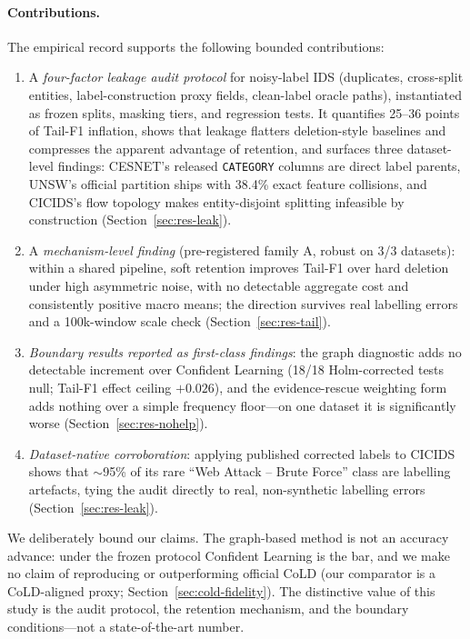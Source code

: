 \documentclass[pdflatex,referee,lineno,sn-basic,Numbered]{sn-jnl}
\begin{document}
\paragraph{Contributions.}
The empirical record supports the following bounded contributions:
\begin{enumerate}
\item A \emph{four-factor leakage audit protocol} for noisy-label IDS
(duplicates, cross-split entities, label-construction proxy fields, clean-label
oracle paths), instantiated as frozen splits, masking tiers, and regression
tests. It quantifies 25--36 points of Tail-F1 inflation, shows that leakage
flatters deletion-style baselines and compresses the apparent advantage of
retention, and surfaces three dataset-level findings: CESNET's released
\texttt{CATEGORY} columns are direct label parents, UNSW's official partition
ships with 38.4\% exact feature collisions, and CICIDS's flow topology makes
entity-disjoint splitting infeasible by construction
(Section~\ref{sec:res-leak}).
\item A \emph{mechanism-level finding} (pre-registered family A, robust on 3/3
datasets): within a shared pipeline, soft retention improves Tail-F1 over hard
deletion under high asymmetric noise, with no detectable aggregate cost and
consistently positive macro means; the direction survives real labelling
errors and a 100k-window scale check (Section~\ref{sec:res-tail}).
\item \emph{Boundary results reported as first-class findings}: the graph
diagnostic adds no detectable increment over Confident Learning (18/18
Holm-corrected tests null; Tail-F1 effect ceiling $+0.026$), and the
evidence-rescue weighting form adds nothing over a simple frequency floor---on
one dataset it is significantly worse (Section~\ref{sec:res-nohelp}).
\item \emph{Dataset-native corroboration}: applying published corrected labels
to CICIDS shows that $\sim$95\% of its rare ``Web Attack -- Brute Force'' class
are labelling artefacts, tying the audit directly to real, non-synthetic
labelling errors (Section~\ref{sec:res-leak}).
\end{enumerate}
We deliberately bound our claims. The graph-based method is not an accuracy
advance: under the frozen protocol Confident Learning is the bar, and we make
no claim of reproducing or outperforming official CoLD (our comparator is a
CoLD-aligned proxy; Section~\ref{sec:cold-fidelity}). The distinctive value of
this study is the audit protocol, the retention mechanism, and the boundary
conditions---not a state-of-the-art number.
\end{document}
